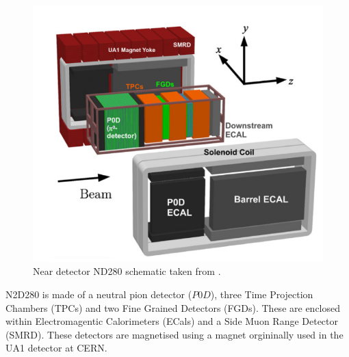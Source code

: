 \begin{figure}
    \includegraphics[width=\textwidth]{Figures/nd280_complex.png}
    \caption{Near detector ND280 schematic taken from \cite{t2kcollaborationT2KExperiment2011}.}
\label{fig:ND280_schematic}
\end{figure}

N2D280 is made of a neutral pion detector ($P0D$), three Time Projection Chambers (TPCs) and two Fine Grained Detectors (FGDs). These are enclosed within Electromagentic Calorimeters (ECals) and a Side Muon Range Detector (SMRD). These detectors are magnetised using a magnet orgininally used in the UA1 detector at CERN. 

